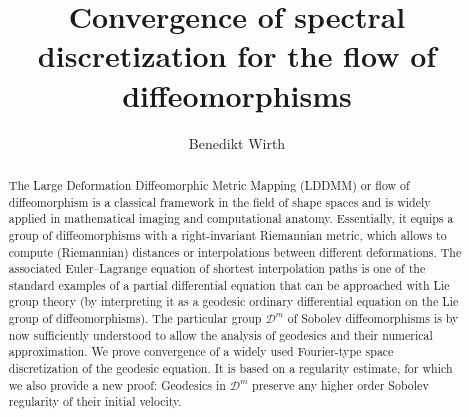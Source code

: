 \documentclass[a4paper, 12pt]{article}
\newcommand{\DiffSob}{\mathcal D}
\begin{document}
\title{Convergence of spectral discretization for the flow of diffeomorphisms}
\author{Benedikt Wirth}
\date{}

\maketitle

\begin{abstract}
The Large Deformation Diffeomorphic Metric Mapping (LDDMM) or flow of diffeomorphism is a classical framework in the field of shape spaces and is widely applied in mathematical imaging and computational anatomy.
Essentially, it equips a group of diffeomorphisms with a right-invariant Riemannian metric, which allows to compute (Riemannian) distances or interpolations between different deformations.
The associated Euler--Lagrange equation of shortest interpolation paths is one of the standard examples of a partial differential equation that can be approached with Lie group theory
(by interpreting it as a geodesic ordinary differential equation on the Lie group of diffeomorphisms).
The particular group $\DiffSob^m$ of Sobolev diffeomorphisms is by now sufficiently understood to allow the analysis of geodesics and their numerical approximation.
We prove convergence of a widely used Fourier-type space discretization of the geodesic equation.
It is based on a regularity estimate, for which we also provide a new proof:
Geodesics in $\DiffSob^m$ preserve any higher order Sobolev regularity of their initial velocity.
\end{abstract}

%
\end{document}
